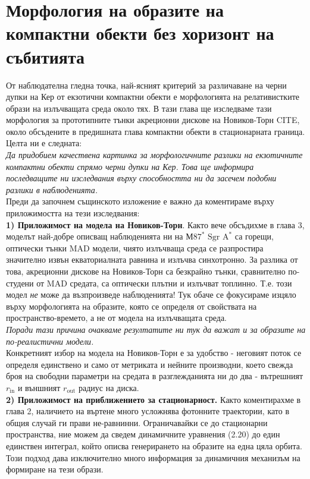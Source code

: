 \section{Морфология на образите на компактни обекти без хоризонт на събитията}
От наблюдателна гледна точка, най-ясният критерий за различаване на черни дупки на Кер от екзотични компактни обекти е морфологията на релативистките образи на излъчващата среда около тях. В тази глава ще изследваме тази морфология за прототипните тънки акреционни дискове на Новиков-Торн CITE, около обсъдените в предишната глава компактни обекти в стационарната граница. Целта ни е следната:\\

\emph{Да придобием качествена картинка за морфологичните разлики на екзотичните компактни обекти спрямо черни дупки на Кер. Това ще информира последващите ни изследвания върху способността ни да засечем подобни разлики в наблюденията.}\\

Преди да започнем същинското изложение е важно да коментираме върху приложимостта на тези изследвания:\\

\textbf{1) Приложимост на модела на Новиков-Торн}. Както вече обсъдихме в глава 3, моделът най-добре описващ наблюденията ни на М$87^*$ $\text{Sgr A}^*$ са горещи, оптически тънки MAD модели, чиято излъчваща среда се разпростира значително извън екваториалната равнина и излъчва синхотронно. За разлика от това, акреционни дискове на Новиков-Торн са безкрайно тънки, сравнително по-студени от MAD средата, са оптически плътни и излъчват топлинно. Т.е. този модел \emph{не} може да възпроизведе наблюденията! Тук обаче се фокусираме изцяло върху морфологията на образите, която се определя от свойствата на пространство-времето, а не от модела на излъчващата среда.\\

\emph{Поради тази причина очакваме резултатите ни тук да важат и за образите на по-реалистични модели.} \\

Конкретният избор на модела на Новиков-Торн е за удобство - неговият поток се определя единствено и само от метриката и нейните производни, което свежда броя на свободни параметри на средата в разглежданията ни до два - вътрешният $r_{\text{in}}$ и външният $r_\text{out}$ радиус на диска.\\

\textbf{2) Приложимост на приближението за стационарност.} Както коментирахме в глава 2, наличието на въртене много усложнява фотонните траектории, като в общия случай ги прави не-равнинни. Ограничавайки се до стационарни пространства, ние можем да сведем динамичните уравнения (2.20) до един единствен интеграл, който описва генерирането на образите на една цяла орбита. Този подход дава изключително много информация за динамичния механизъм на формиране на тези образи.\\

